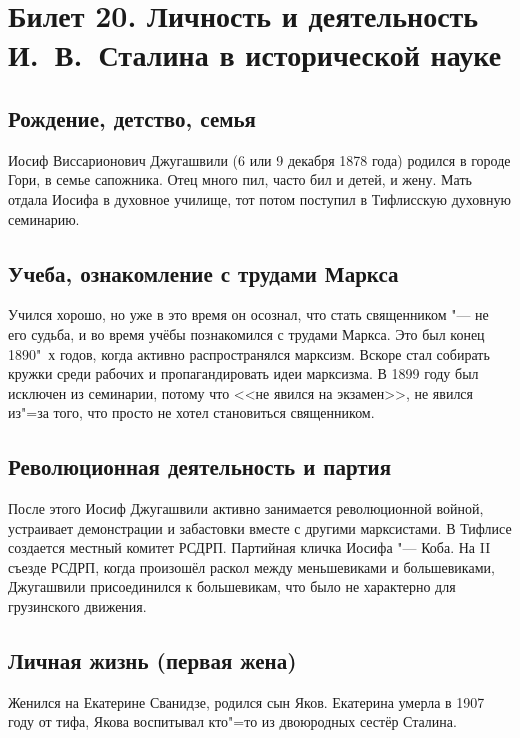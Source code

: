 \section{Билет 20. Личность и деятельность И.~В.~Сталина в исторической науке}

\subsection{Рождение, детство, семья}

Иосиф Виссарионович Джугашвили (6 или 9 декабря 1878 года) родился в городе Гори, в семье сапожника. Отец много пил, часто бил и детей, и жену. Мать отдала Иосифа в духовное училище, тот потом поступил в Тифлисскую духовную семинарию.

\subsection{Учеба, ознакомление с трудами Маркса}

Учился хорошо, но уже в это время он осознал, что стать священником "--- не его судьба, и во время учёбы познакомился с трудами Маркса. Это был конец 1890"~х годов, когда активно распространялся марксизм. Вскоре стал собирать кружки среди рабочих и пропагандировать идеи марксизма. В 1899 году был исключен из семинарии, потому что <<не явился на экзамен>>, не явился из"=за того, что просто не хотел становиться священником.

\subsection{Революционная деятельность и партия}

После этого Иосиф Джугашвили активно занимается революционной войной, устраивает демонстрации и забастовки вместе с другими марксистами. В Тифлисе создается местный комитет РСДРП. Партийная кличка Иосифа "--- Коба. На II съезде РСДРП, когда произошёл раскол между меньшевиками и большевиками, Джугашвили присоединился к большевикам, что было не характерно для грузинского движения.

\subsection{Личная жизнь (первая жена)}

Женился на Екатерине Сванидзе, родился сын Яков. Екатерина умерла в 1907 году от тифа, Якова воспитывал кто"=то из двоюродных сестёр Сталина. 

